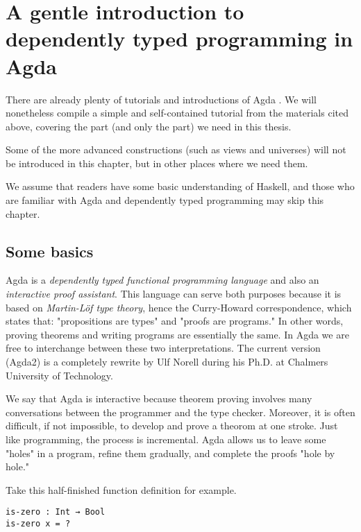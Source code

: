 \documentclass[../thesis.tex]{subfiles}
\begin{document}
\chapter{A gentle introduction to dependently typed programming in Agda}\label{agda}

There are already plenty of tutorials and introductions of Agda
\cite{norell2009dependently}\cite{FLOLAC16DTP}\cite{brutal}.
We will nonetheless compile a simple and self-contained tutorial from the
materials cited above, covering the part (and only the part) we need in this thesis.

Some of the more advanced constructions (such as views and universes) will not
be introduced in this chapter, but in other places where we need them.

We assume that readers have some basic understanding of Haskell, and those
who are familiar with Agda and dependently typed programming may skip this chapter.

\section{Some basics}

Agda is a \textit{dependently typed functional programming language} and also an
\textit{interactive proof assistant}. This language can serve both purposes because
it is based on \textit{Martin-Löf type theory}\cite{martin1984intuitionistic},
hence the Curry-Howard correspondence\cite{sorensen2006lectures},
which states that: "propositions are types" and "proofs are programs."
In other words, proving theorems and writing programs are essentially the same.
In Agda we are free to interchange between these two interpretations.
The current version (Agda2) is a completely rewrite by Ulf Norell during his
Ph.D. at Chalmers University of Technology.

We say that Agda is interactive because theorem proving involves many
conversations between the programmer and the type checker.
Moreover, it is often difficult, if not impossible, to develop and prove a theorom at one stroke.
Just like programming, the process is incremental.
Agda allows us to leave some "holes" in a program, refine them gradually, and
complete the proofs "hole by hole."

Take this half-finished function definition for example.

\begin{lstlisting}
is-zero : Int → Bool
is-zero x = ?
\end{lstlisting}
\end{document}
